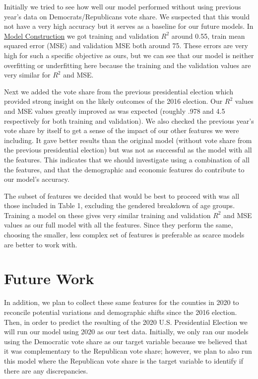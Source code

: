 \documentclass[letterpaper, twocolumn]{article}
\begin{document}
Initially we tried to see how well our model performed without using previous year’s data on Democrats/Republicans vote share. We suspected that this would not have a very high accuracy but it serves as a baseline for our future models. In \href{https://tinyurl.com/y358omxq}{Model Construction} we got training and validation $R^2$ around 0.55, train mean squared error (MSE) and validation MSE both around 75. These errors are very high for such a specific objective as ours, but we can see that our model is neither overfitting or underfitting here because the training and the validation values are very similar for $R^2$ and MSE. 

Next we added the vote share from the previous presidential election which provided strong insight on the likely outcomes of the 2016 election. Our $R^2$ values and MSE values greatly improved as was expected (roughly .978 and 4.5 respectively for both training and validation). We also checked the previous year’s vote share by itself to get a sense of the impact of our other features we were including. It gave better results than the original model (without vote share from the previous presidential election) but was not as successful as the model with all the features. This indicates that we should investigate using a combination of all the features, and that the demographic and economic features do contribute to our model’s accuracy. 

The subset of features we decided that would be best to proceed with was all those included in Table 1, excluding the gendered breakdown of age groups. Training a model on these gives very similar training and validation $R^2$ and MSE values as our full model with all the features. Since they perform the same, choosing the smaller, less complex set of features is preferable as scarce models are better to work with.


\section{Future Work}

In addition, we plan to collect these same features for the counties in 2020 to reconcile potential variations and demographic shifts since the 2016 election. Then, in order to predict the resulting of the 2020 U.S. Presidential Election we will run our model using 2020 as our test data.
Initially, we only ran our models using the Democratic vote share as our target variable because we believed that it was complementary to the Republican vote share; however, we plan to also run this model where the Republican vote share is the target variable to identify if there are any discrepancies.
\end{document}
